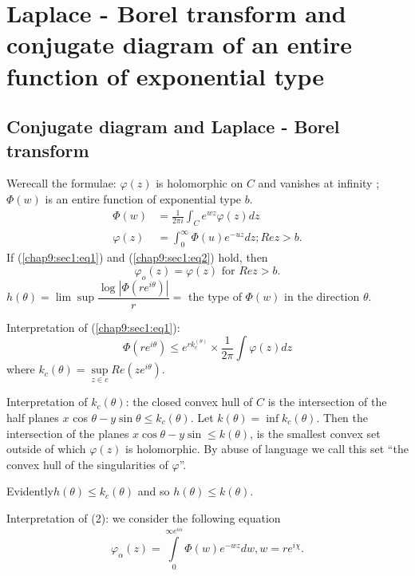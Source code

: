 \chapter[Laplace - Borel transform and conjugate diagram...]{Laplace - Borel transform and conjugate diagram
 of an entire function of exponential type}\label{chap9}%

\section[Conjugate diagram and Laplace - Borel...]{Conjugate diagram and Laplace - Borel\hfil\break
  transform}\label{chap9:sec1} %

We\pageoriginale recall the formulae: $\varphi (z)$ is holomorphic on $C$ and
vanishes at infinity ; $\Phi (w)$ is an entire function of exponential
type $b$. 
\begin{align*}
 \Phi (w) & = \frac{1}{2 \pi i} \int_C e^{wz} \varphi (z) dz
 \tag{1}\label{chap9:sec1:eq1} \\
 \varphi (z) & = \int^\infty_0 \Phi (u) e^{-uz} dz ; Re z >
 b. \tag{2}\label{chap9:sec1:eq2} 
\end{align*}
If (\ref{chap9:sec1:eq1}) and (\ref{chap9:sec1:eq2}) hold, then
\begin{equation*}
 \varphi_o (z) = \varphi (z) \text{ for } Re z >
 b. \tag{3}\label{chap9:sec1:eq3}  
\end{equation*}
$h (\theta) = \lim \sup \dfrac{ \log |\Phi (r e^{i \theta})|}{r}=$ the
type of $\Phi (w)$ in the direction $\theta$. 

Interpretation of (\ref{chap9:sec1:eq1}): 
$$
\Phi (r e^{i \theta}) \le e^{rk_c^{(\theta)}} \times \frac{1}{2 \pi }
\int \varphi (z) dz 
$$
where $k_c (\theta) = \sup\limits_{z \in c} Re (ze^{i \theta})$.

Interpretation of $k_c (\theta)$: the closed convex hull of $C$ is the
intersection of the half planes $x$ cos $\theta - y \sin \theta \le
k_c (\theta)$. Let $k(\theta) = \inf k_c (\theta)$. Then the
intersection of the planes $x \cos \theta - y \sin \le k (\theta)$, 
is the smallest convex set outside of which $\varphi (z)$ is
holomorphic. By abuse of language we call this set ``the convex hull
of the singularities of $\varphi$''. 

Evidently\pageoriginale $h(\theta) \le k_c (\theta)$ and so $h (\theta) \le k (\theta)$.

Interpretation of (2): we consider the following equation
\begin{equation*}
 \varphi_\alpha (z) = \int\limits^{\infty e^{i \alpha}}_0 \Phi (w) e^{-wz}
 dw, w= r e^{i \chi}. \tag{$2_\alpha$} 
\end{equation*}

